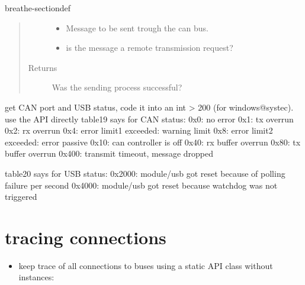 \documentclass[a4paper,10pt,english]{sphinxmanual}
\begin{document}
\begin{fulllineitems}
\begin{sphinxuseclass}{breathe-sectiondef}
\begin{fulllineitems}
\begin{quote}
\begin{description}
\begin{itemize}
\item {} 
\sphinxAtStartPar
{} \textendash{} Message to be sent trough the can bus. 

\item {} 
\sphinxAtStartPar
{} \textendash{} is the message a remote transmission request? 

\end{itemize}

\item[{Returns}] \leavevmode
\sphinxAtStartPar
Was the sending process successful? 

\end{description}\end{quote}

\end{fulllineitems}


\begin{fulllineitems}
\label{\detokenize{classesdetails:_CPPv4N9STCanScan13getPortStatusEv}}%
\pysigstartmultiline
{}%
\pysigstopmultiline
\sphinxAtStartPar
get CAN port and USB status, code it into an int \textgreater{} 200 (for windows@systec). use the API directly table19 says for CAN status: 0x0: no error 0x1: tx overrun 0x2: rx overrun 0x4: error limit1 exceeded: warning limit 0x8: error limit2 exceeded: error passive 0x10: can controller is off 0x40: rx buffer overrun 0x80: tx buffer overrun 0x400: transmit timeout, message dropped

\sphinxAtStartPar
table20 says for USB status: 0x2000: module/usb got reset because of polling failure per second 0x4000: module/usb got reset because watchdog was not triggered 

\end{fulllineitems}


\end{sphinxuseclass}
\end{fulllineitems}



\section{tracing connections}
\label{\detokenize{classesdetails:tracing-connections}}\begin{itemize}
\item {} 
\sphinxAtStartPar
keep trace of all connections to buses using a static API class without instances:

\end{itemize}
\end{document}
